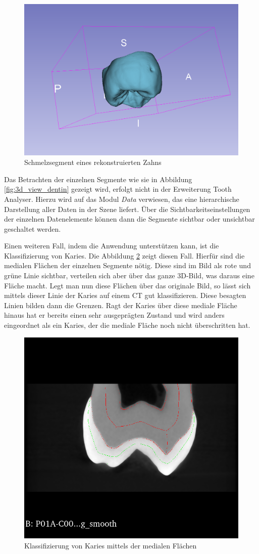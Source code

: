 \begin{figure}[h]
\begin{minipage}[b]{0.32\textwidth}
		\includegraphics[width=\textwidth]{img/3dViewEnamel.png}
		\caption{Schmelzsegment eines rekonstruierten Zahns}
		\label{fig:3d_view_schmelz}
	\end{minipage}
\end{figure}

Das Betrachten der einzelnen Segmente wie sie in Abbildung
\ref{fig:3d_view_dentin} gezeigt wird, erfolgt nicht in der Erweiterung Tooth Analyser.
Hierzu wird auf das Modul \textit{Data} verwiesen, das eine hierarchische
Darstellung aller Daten in der Szene liefert. Über die Sichtbarkeitseinstellungen
der einzelnen Datenelemente können dann die Segmente sichtbar oder unsichtbar geschaltet
werden.

Einen weiteren Fall, indem die Anwendung unterstützen kann, ist die Klassifizierung
von Karies. Die Abbildung \ref{fig:classification} zeigt diesen Fall. Hierfür sind
die medialen Flächen der einzelnen Segmente nötig. Diese sind im Bild als rote
und grüne Linie sichtbar, verteilen sich aber über das ganze \ac{3D}-Bild, was daraus
eine Fläche macht. Legt man nun diese Flächen über das originale Bild, so lässt
sich mittels dieser Linie der Karies auf einem \ac{CT} gut klassifizieren. Diese
besagten Linien bilden dann die Grenzen. Ragt der Karies über diese mediale Fläche
hinaus hat er bereits einen sehr ausgeprägten Zustand und wird anders eingeordnet
als ein Karies, der die mediale Fläche noch nicht überschritten hat.

\begin{figure}[h]
	\centering
	\includegraphics[width=0.4 \textwidth]{img/classification.png}
	\caption{Klassifizierung von Karies mittels der medialen Flächen}
	\label{fig:classification}
\end{figure}

